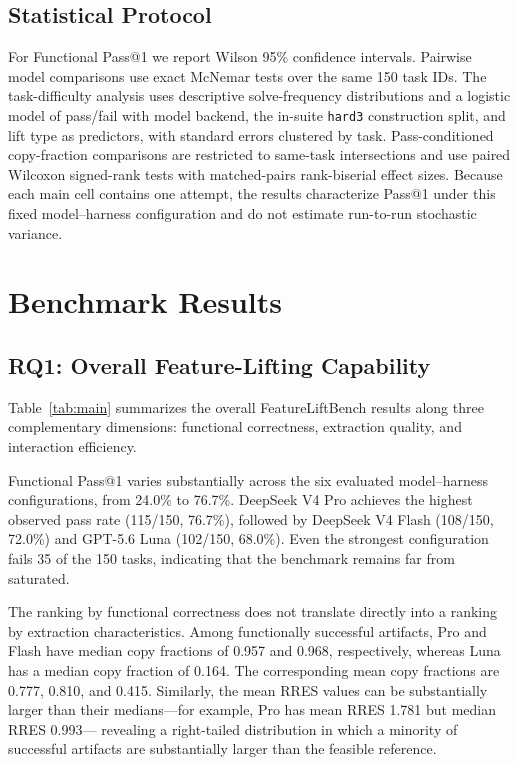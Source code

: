 \documentclass[acmsmall,screen,review,anonymous]{acmart}
\begin{document}
\subsection{Statistical Protocol}

For Functional Pass@1 we report Wilson 95\% confidence intervals. Pairwise model
comparisons use exact McNemar tests over the same 150 task IDs. The task-difficulty
analysis uses descriptive solve-frequency distributions and a logistic model of
pass/fail with model backend, the in-suite \texttt{hard3} construction split, and
lift type as predictors, with standard errors clustered by task. Pass-conditioned
copy-fraction comparisons are restricted to same-task intersections and use paired
Wilcoxon signed-rank tests with matched-pairs rank-biserial effect sizes. Because
each main cell contains one attempt, the results characterize Pass@1 under this
fixed model--harness configuration and do not estimate run-to-run stochastic
variance.

\section{Benchmark Results}
\label{sec:results}

\subsection{RQ1: Overall Feature-Lifting Capability}
\label{sec:rq1}

Table~\ref{tab:main} summarizes the overall FeatureLiftBench results
along three complementary dimensions: functional correctness,
extraction quality, and interaction efficiency.

Functional Pass@1 varies substantially across the six evaluated
model--harness configurations, from 24.0\% to 76.7\%.
DeepSeek V4 Pro achieves the highest observed pass rate
(115/150, 76.7\%), followed by DeepSeek V4 Flash
(108/150, 72.0\%) and GPT-5.6 Luna (102/150, 68.0\%).
Even the strongest configuration fails 35 of the 150 tasks,
indicating that the benchmark remains far from saturated.

The ranking by functional correctness does not translate directly
into a ranking by extraction characteristics.
Among functionally successful artifacts, Pro and Flash have median
copy fractions of 0.957 and 0.968, respectively, whereas Luna has a
median copy fraction of 0.164.
The corresponding mean copy fractions are 0.777, 0.810, and 0.415.
Similarly, the mean RRES values can be substantially larger than their
medians---for example, Pro has mean RRES 1.781 but median RRES 0.993---
revealing a right-tailed distribution in which a minority of successful
artifacts are substantially larger than the feasible reference.
\end{document}
